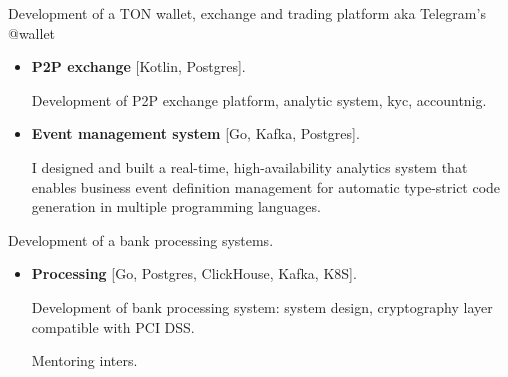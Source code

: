 \documentclass{cv}
\begin{document}
\begin{cvblock}{
		}

	Development of a TON wallet, exchange and trading platform aka Telegram's @wallet

	\begin{itemize}
		\item \textbf{P2P exchange} [Kotlin, Postgres].

		      Development of P2P exchange platform, analytic system, kyc, accountnig.

		\item \textbf{Event management system} [Go, Kafka, Postgres].

		      I designed and built a real-time, high-availability analytics system that enables
		      business event definition management for automatic type-strict code generation
		      in multiple programming languages.

	\end{itemize}
\end{cvblock}

\begin{cvblock}{%
		}

	Development of a bank processing systems.

	\begin{itemize}
		\item \textbf{Processing} [Go, Postgres, ClickHouse, Kafka, K8S].

		      Development of bank processing system: system design,
		      cryptography layer compatible with PCI DSS.

		      Mentoring inters.

	\end{itemize}
\end{cvblock}
\end{document}
